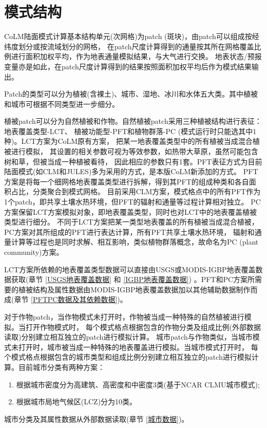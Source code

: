 \chapter{模式结构}\label{模式结构}

CoLM陆面模式计算基本结构单元(次网格)为patch (斑块)，由patch可以组成按经纬度划分或按流域划分的网格，
在patch尺度计算得到的通量按其所在网格覆盖比例进行面积加权平均，作为地表通量模拟结果，与大气进行交换。
地表状态/预报变量亦是如此，在patch尺度计算得到的结果按照面积加权平均后作为模式结果输出。


Patch的类型可以分为植被(含裸土)、城市、湿地、冰川和水体五大类。其中植被和城市可根据不同类型进一步细分。


植被patch可以分为自然植被和作物。自然植被patch采用三种植被结构进行表征：地表覆盖类型-LCT、
植被功能型-PFT和植物群落-PC (模式运行时只能选其中1种)。LCT方案为CoLM原有方案，
把某一地表覆盖类型中的所有植被当成混合植被进行模拟，
其设置的相关参数可视为等效参数，如热带大草原，虽然可能包含树和草，但被当成一种植被看待，
因此相应的参数只有1套。PFT表征方式为目前陆面模式(如CLM和JULES)多为采用的方式，是本版CoLM新添加的方式。
PFT方案是将每一个细网格地表覆盖类型进行拆解，得到其PFT的组成种类和各自面积占比，分类聚合到模式网格。
目前采用CLM方案，模式格点中的所有PFT作为1个patch，即共享土壤水热环境，但PFT的辐射和通量等过程计算相对独立。
PC方案保留LCT方案模拟对象，即地表覆盖类型，同时也对LCT中的地表覆盖植被类型进行细分。
不同于LCT方案把某一类型地表覆盖的所有植被当成混合植被，PC方案对其所组成的PFT进行表达计算，所有PFT共享土壤水热环境，
辐射和通量计算等过程也是同时求解、相互影响，类似植物群落概念，故命名为PC (plant community)方案。


LCT方案所依赖的地表覆盖类型数据可以直接由USGS或MODIS-IGBP地表覆盖数据获取(章节 \ref{USGS地表覆盖数据} 和 \ref{IGBP地表覆盖数据}) 
。PFT和PC方案所需要的植被结构及属性数据由MODIS-IGBP地表覆盖数据加以其他辅助数据制作而成(章节 \ref{PFTPC数据及其依赖数据})。


对于作物patch，当作物模式未打开时，作物被当成一种特殊的自然植被进行模拟。当打开作物模式时，
每个模式格点根据包含的作物分类及组成比例(外部数据读取)分别建立相互独立的patch进行模拟计算。
城市patch与作物类似，当城市模式未打开时，城市被当成一种特殊的地表覆盖进行模拟。当城市模式打开时，
每个模式格点根据包含的城市类型和组成比例分别建立相互独立的patch进行模拟计算。目前城市分类有两种方案：
\begin{enumerate}
    \item 根据城市密度分为高建筑、高密度和中密度3类(基于NCAR CLMU城市模式);
    \item 根据城市局地气候区(LCZ)分为10类。
\end{enumerate}
城市分类及其属性数据从外部数据读取(章节 \ref{城市数据})。


